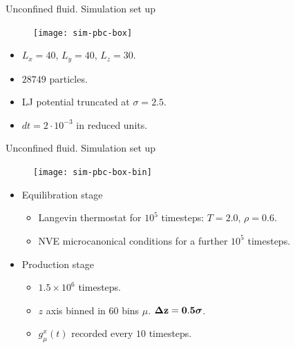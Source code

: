 \documentclass{beamer}
\begin{document}
\begin{frame}{Unconfined fluid. Simulation set up}
  \begin{center}
  \begin{figure}
    \texttt{[image: sim-pbc-box]}
\end{figure}
    \begin{itemize}
     \item<1-> $L_{x}=40$, $L_{y}=40$, $L_{z}=30$.
     \item<2-> $28749$ particles.
     \item<3-> LJ potential truncated at $\sigma=2.5$.
     \item<4-> $dt=2\cdot 10^{-3}$ in reduced units. 
    \end{itemize}
  \end{center}
\end{frame}


\begin{frame}{Unconfined fluid. Simulation set up}
  \begin{figure}
    \texttt{[image: sim-pbc-box-bin]}
  \end{figure}
   \begin{itemize}
     \item<1-> Equilibration stage
       \begin{itemize}
         \item Langevin thermostat for $10^5$ timesteps: $T=2.0$, $\rho=0.6$.
         \item NVE microcanonical conditions for a further $10^5$ timesteps.
          \end{itemize}
        \item<2-> Production stage
       \begin{itemize}
         \item $1.5\times10^6$ timesteps.
         \item $z$ axis binned in $60$ bins $\mu$. {$\boldsymbol{\Delta} {\bf z=0.5}\boldsymbol{\sigma}$}.
         \item $g_{\mu}^x(t)$ recorded every $10$ timesteps.
         \end{itemize}
     \end{itemize}
 \end{frame}
\end{document}
